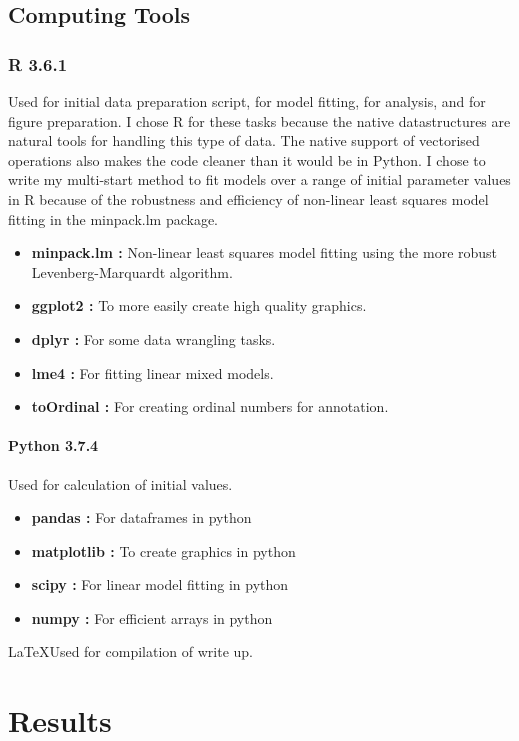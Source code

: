 \documentclass[11pt, a4paper]{article}
\begin{document}
\begin{linenumbers}
\subsection{Computing Tools}
\subsubsection{R 3.6.1 \cite{R}} Used for initial data preparation script, for model fitting, for analysis, and for figure preparation. I chose R for these tasks because the native datastructures are natural tools for handling this type of data. The native support of vectorised operations also makes the code cleaner than it would be in Python. I chose to write my multi-start method to fit models over a range of initial parameter values in R because of the robustness and efficiency of non-linear least squares model fitting in the minpack.lm package.
\begin{itemize}
\item \textbf{minpack.lm \cite{minpack}:} Non-linear least squares model fitting using the more robust Levenberg-Marquardt algorithm.
\item \textbf{ggplot2 \cite{gg}:} To more easily create high quality graphics.
\item \textbf{dplyr \cite{dplyr}:} For some data wrangling tasks.
\item \textbf{lme4 \cite{lme4}:} For fitting linear mixed models.
\item \textbf{toOrdinal \cite{tO}:} For creating ordinal numbers for annotation.
\end{itemize}

\paragraph{Python 3.7.4 \cite{python}} Used for calculation of initial values.
\begin{itemize}
\item \textbf{pandas \cite{pd}:} For dataframes in python
\item \textbf{matplotlib \cite{plt}:} To create graphics in python
\item \textbf{scipy \cite{numpy}:} For linear model fitting in python
\item \textbf{numpy \cite{numpy}:} For efficient arrays in python
\end{itemize}

\LaTeX Used for compilation of write up.
\section{Results}


\end{linenumbers}
\end{document}
